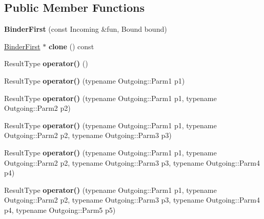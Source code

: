\subsection*{Public Member Functions}
\begin{DoxyCompactItemize}
\item 
\hypertarget{classutilspp_1_1BinderFirst_abfbd1c06cda97a041cd0847338bc8c17}{{\bfseries Binder\-First} (const Incoming \&fun, Bound bound)}\label{classutilspp_1_1BinderFirst_abfbd1c06cda97a041cd0847338bc8c17}

\item 
\hypertarget{classutilspp_1_1BinderFirst_a52db81ffa8bc5cb9aaaf5d79c2fdaf35}{\hyperlink{classutilspp_1_1BinderFirst}{Binder\-First} $\ast$ {\bfseries clone} () const }\label{classutilspp_1_1BinderFirst_a52db81ffa8bc5cb9aaaf5d79c2fdaf35}

\item 
\hypertarget{classutilspp_1_1BinderFirst_a7332050e7bb7b22d1d34d6b9021d5341}{Result\-Type {\bfseries operator()} ()}\label{classutilspp_1_1BinderFirst_a7332050e7bb7b22d1d34d6b9021d5341}

\item 
\hypertarget{classutilspp_1_1BinderFirst_a39130945d45a44a34e8d1e50e1ed155b}{Result\-Type {\bfseries operator()} (typename Outgoing\-::\-Parm1 p1)}\label{classutilspp_1_1BinderFirst_a39130945d45a44a34e8d1e50e1ed155b}

\item 
\hypertarget{classutilspp_1_1BinderFirst_ab87007390fce647f703058bb0490a69b}{Result\-Type {\bfseries operator()} (typename Outgoing\-::\-Parm1 p1, typename Outgoing\-::\-Parm2 p2)}\label{classutilspp_1_1BinderFirst_ab87007390fce647f703058bb0490a69b}

\item 
\hypertarget{classutilspp_1_1BinderFirst_a24be37c110ea7ced8aab8deb084d639e}{Result\-Type {\bfseries operator()} (typename Outgoing\-::\-Parm1 p1, typename Outgoing\-::\-Parm2 p2, typename Outgoing\-::\-Parm3 p3)}\label{classutilspp_1_1BinderFirst_a24be37c110ea7ced8aab8deb084d639e}

\item 
\hypertarget{classutilspp_1_1BinderFirst_a9245e530d25c19c1bfb7f4977762a0c1}{Result\-Type {\bfseries operator()} (typename Outgoing\-::\-Parm1 p1, typename Outgoing\-::\-Parm2 p2, typename Outgoing\-::\-Parm3 p3, typename Outgoing\-::\-Parm4 p4)}\label{classutilspp_1_1BinderFirst_a9245e530d25c19c1bfb7f4977762a0c1}

\item 
\hypertarget{classutilspp_1_1BinderFirst_af0f8eb10530c0faafd8b02facf4baa6d}{Result\-Type {\bfseries operator()} (typename Outgoing\-::\-Parm1 p1, typename Outgoing\-::\-Parm2 p2, typename Outgoing\-::\-Parm3 p3, typename Outgoing\-::\-Parm4 p4, typename Outgoing\-::\-Parm5 p5)}\label{classutilspp_1_1BinderFirst_af0f8eb10530c0faafd8b02facf4baa6d}


\end{DoxyCompactItemize}

